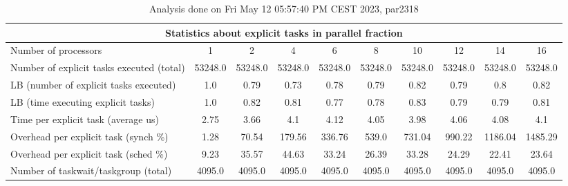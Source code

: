 \begin{table}[h]
\begin{center}
\begin{tabular}{|l|c|c|c|c|c|c|c|c|c|}
\hline
\multicolumn{10}{|c|}{Statistics about explicit tasks in parallel fraction} \\
\hline
\hline
Number of processors & 1 & 2 & 4 & 6 & 8 & 10 & 12 & 14 & 16 \\
\hline
\hline
Number of explicit tasks executed (total)        &         53248.0 &         53248.0 &         53248.0 &         53248.0 &         53248.0 &         53248.0 &         53248.0 &         53248.0 &         53248.0 \\
\hline
LB (number of explicit tasks executed)           &             1.0 &            0.79 &            0.73 &            0.78 &            0.79 &            0.82 &            0.79 &             0.8 &            0.82 \\
\hline
LB (time executing explicit tasks)               &             1.0 &            0.82 &            0.81 &            0.77 &            0.78 &            0.83 &            0.79 &            0.79 &            0.81 \\
\hline
Time per explicit task (average us)                 &            2.75 &            3.66 &             4.1 &            4.12 &            4.05 &            3.98 &            4.06 &            4.08 &             4.1 \\
\hline
Overhead per explicit task (synch \%)             &            1.28 &           70.54 &          179.56 &          336.76 &           539.0 &          731.04 &          990.22 &         1186.04 &         1485.29 \\
\hline
Overhead per explicit task (sched \%)             &            9.23 &           35.57 &           44.63 &           33.24 &           26.39 &           33.28 &           24.29 &           22.41 &           23.64 \\
\hline
Number of taskwait/taskgroup (total)             &          4095.0 &          4095.0 &          4095.0 &          4095.0 &          4095.0 &          4095.0 &          4095.0 &          4095.0 &          4095.0 \\
\hline
\end{tabular}
\end{center}
\caption{ Analysis done on Fri May 12 05:57:40 PM CEST 2023, par2318}
\end{table}
